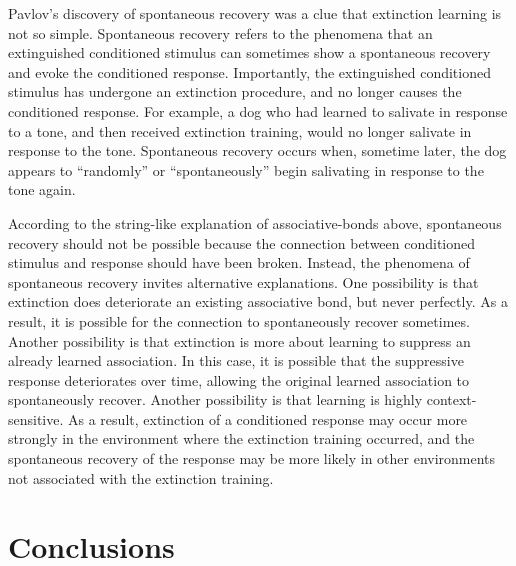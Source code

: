 \documentclass[
  oneside,
  12pt]{crumpbook}
\begin{document}
Pavlov's discovery of spontaneous recovery was a clue that extinction learning is not so simple. Spontaneous recovery refers to the phenomena that an extinguished conditioned stimulus can sometimes show a spontaneous recovery and evoke the conditioned response. Importantly, the extinguished conditioned stimulus has undergone an extinction procedure, and no longer causes the conditioned response. For example, a dog who had learned to salivate in response to a tone, and then received extinction training, would no longer salivate in response to the tone. Spontaneous recovery occurs when, sometime later, the dog appears to ``randomly'' or ``spontaneously'' begin salivating in response to the tone again.

According to the string-like explanation of associative-bonds above, spontaneous recovery should not be possible because the connection between conditioned stimulus and response should have been broken. Instead, the phenomena of spontaneous recovery invites alternative explanations. One possibility is that extinction does deteriorate an existing associative bond, but never perfectly. As a result, it is possible for the connection to spontaneously recover sometimes. Another possibility is that extinction is more about learning to suppress an already learned association. In this case, it is possible that the suppressive response deteriorates over time, allowing the original learned association to spontaneously recover. Another possibility is that learning is highly context-sensitive. As a result, extinction of a conditioned response may occur more strongly in the environment where the extinction training occurred, and the spontaneous recovery of the response may be more likely in other environments not associated with the extinction training.

\hypertarget{conclusions}{%
\section{Conclusions}\label{conclusions}}
\end{document}

